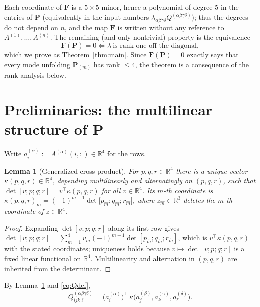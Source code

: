 \documentclass[12pt]{article}
\newcommand{\bR}{\mathbb{R}}
\newtheorem{lemma}{Lemma}
\theoremstyle{definition}
\begin{document}
Each coordinate of $\mathbf F$ is a $5\times5$ minor, hence a polynomial of degree
$5$ in the entries of $\mathbf P$ (equivalently in the input numbers
$\lambda_{\alpha\beta\gamma\delta}Q^{(\alpha\beta\gamma\delta)}$); thus the
degrees do not depend on $n$, and the map $\mathbf F$ is written without any
reference to $A^{(1)},\dots,A^{(n)}$.  The remaining (and only nontrivial)
property is the equivalence
\begin{equation}\label{eq:goal}
\mathbf F(\mathbf P)=0
\iff
\lambda\ \text{is rank-one off the diagonal},
\end{equation}
which we prove as Theorem~\ref{thm:main}.  Since $\mathbf F(\mathbf P)=0$ exactly
says that every mode unfolding $\mathbf P_{(m)}$ has rank $\le 4$, the theorem is a
consequence of the rank analysis below.

\section{Preliminaries: the multilinear structure of $\mathbf P$}

Write $a^{(\alpha)}_i:=A^{(\alpha)}(i,:)\in\bR^4$ for the rows.

\begin{lemma}[Generalized cross product]\label{lem:cross}
For $p,q,r\in\bR^4$ there is a unique vector
$\kappa(p,q,r)\in\bR^4$, depending multilinearly and alternatingly on $(p,q,r)$,
such that
$\det[v;p;q;r]=v^{\top}\kappa(p,q,r)$ for all $v\in\bR^4$.  Its $m$-th coordinate
is $\kappa(p,q,r)_m=(-1)^{m-1}\det\bigl[p_{\widehat m};q_{\widehat m};r_{\widehat m}\bigr]$,
where $z_{\widehat m}\in\bR^3$ deletes the $m$-th coordinate of $z\in\bR^4$.
\end{lemma}

\begin{proof}
Expanding $\det[v;p;q;r]$ along its first row gives
$\det[v;p;q;r]=\sum_{m=1}^4 v_m(-1)^{m-1}\det[p_{\widehat m};q_{\widehat m};r_{\widehat m}]$,
which is $v^\top\kappa(p,q,r)$ with the stated coordinates; uniqueness holds because
$v\mapsto\det[v;p;q;r]$ is a fixed linear functional on $\bR^4$.  Multilinearity and
alternation in $(p,q,r)$ are inherited from the determinant.
\end{proof}

By Lemma~\ref{lem:cross} and \eqref{eq:Qdef},
\begin{equation}\label{eq:Qcross}
Q^{(\alpha\beta\gamma\delta)}_{ijk\ell}
=\bigl(a^{(\alpha)}_i\bigr)^{\top}\,
\kappa\bigl(a^{(\beta)}_j,a^{(\gamma)}_k,a^{(\delta)}_\ell\bigr).
\end{equation}
\end{document}

